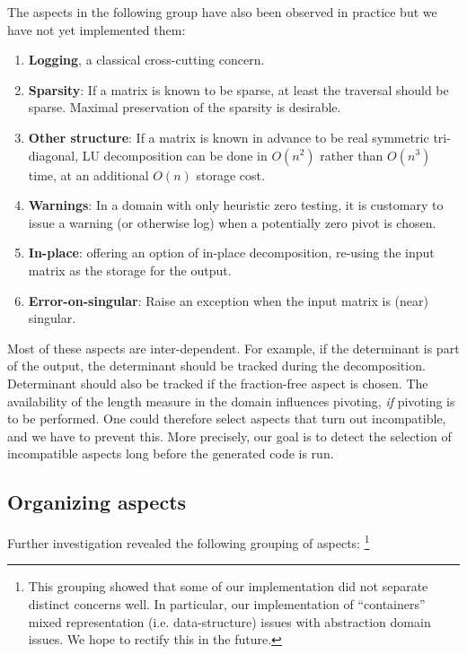 \documentclass{elsart}
\begin{document}
The aspects in the following group have also been observed in
practice but we have not yet implemented them:
\begin{enumerate}
\setcounter{enumi}{\value{naspects}}
\item \textbf{Logging}, a classical cross-cutting concern.
\item \textbf{Sparsity}: If a matrix is known to be sparse, at least
the traversal should be sparse. Maximal preservation of the sparsity
is desirable. 
\item \textbf{Other structure}: If a matrix is known in
advance to be real symmetric tri-diagonal, LU decomposition can be
done in $O(n^2)$ rather than $O(n^3)$ time, at an additional $O(n)$
storage cost.
\item \textbf{Warnings}: In a domain with only heuristic zero
testing, it is customary to issue a warning (or otherwise log) when 
a potentially zero pivot is chosen.
\item \textbf{In-place}: offering an option of in-place decomposition,
  re-using the input matrix as the storage for the output.
\item \textbf{Error-on-singular}: Raise an exception when the input
  matrix is (near) singular.
\setcounter{naspects}{\value{enumi}}
\end {enumerate}

Most of these aspects are inter-dependent. For example, if the
determinant is part of the output, the determinant should be
tracked during the decomposition. Determinant should also be tracked
if the fraction-free aspect is chosen. The availability of the length
measure in the domain influences pivoting, \emph{if} pivoting
is to be performed. One could therefore select aspects that turn out
incompatible, and we have to prevent this. 
More precisely, our goal is to detect the selection of
incompatible aspects long before the generated code is run.

\subsection{Organizing aspects}

Further investigation revealed the following grouping of aspects:%
\footnote{This grouping showed that some of our implementation did not
separate distinct concerns well. In
particular, our implementation of ``containers'' 
mixed representation (i.e. data-structure) issues with abstraction
domain issues.  We hope to rectify this in the future.}
\end{document}
